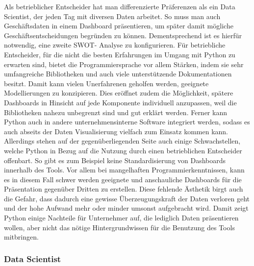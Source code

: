 \documentclass[12pt]{article}
\begin{document}
	Als betrieblicher Entscheider hat man differenzierte Präferenzen als ein Data Scientist,
	der jeden Tag mit diversen Daten arbeitet. So muss man auch Geschäftsdaten in einem
	Dashboard präsentieren, um später damit mögliche Geschäftsentscheidungen
	begründen zu können. Dementsprechend ist es hierfür notwendig, eine zweite SWOT-
	Analyse zu konfigurieren.
	Für betriebliche Entscheider, für die nicht die besten Erfahrungen im Umgang mit Python
	zu erwarten sind, bietet die Programmiersprache vor allem Stärken, indem sie sehr
	umfangreiche Bibliotheken und auch viele unterstützende Dokumentationen besitzt.
	Damit kann vielen Unerfahrenen geholfen werden, geeignete Modellierungen zu
	konzipieren. Dies eröffnet zudem die Möglichkeit, spätere Dashboards in Hinsicht auf
	jede Komponente individuell anzupassen, weil die Bibliotheken nahezu unbegrenzt sind
	und gut erklärt werden.
	Ferner kann Python auch in andere unternehmensinterne Software integriert werden,
	sodass es auch abseits der Daten Visualisierung vielfach zum Einsatz kommen kann.
	Allerdings stehen auf der gegenüberliegenden Seite auch einige Schwachstellen, welche
	Python in Bezug auf die Nutzung durch einen betrieblichen Entscheider offenbart.
	So gibt es zum Beispiel keine Standardisierung von Dashboards innerhalb des Tools. Vor
	allem bei mangelhaften Programmierkenntnissen, kann es in diesem Fall schwer
	werden geeignete und anschauliche Dashboards für die Präsentation gegenüber Dritten
	zu erstellen. Diese fehlende Ästhetik birgt auch die Gefahr, dass dadurch eine gewisse
	Überzeugungskraft der Daten verloren geht und der hohe Aufwand mehr oder minder
	umsonst aufgebracht wird.
	Damit zeigt Python einige Nachteile für Unternehmer auf, die lediglich Daten
	präsentieren wollen, aber nicht das nötige Hintergrundwissen für die Benutzung des
	Tools mitbringen.
	
	\subsubsection{Data Scientist}
	
\end{document}
